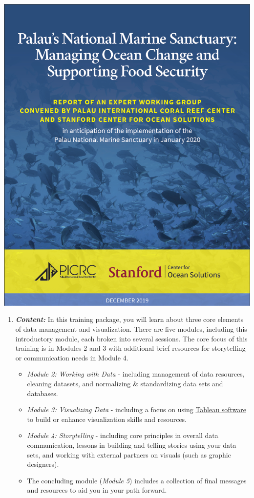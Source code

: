 \documentclass[
]{book}
\providecommand{\tightlist}{%
  \setlength{\itemsep}{0pt}\setlength{\parskip}{0pt}}
\begin{document}
\includegraphics{images/PNMS_Report_Cover.png}

\begin{enumerate}
\def\labelenumi{\arabic{enumi}.}
\setcounter{enumi}{2}
\item
  \textbf{\emph{Content:}} In this training package, you will learn about three core elements of data management and visualization. There are five modules, including this introductory module, each broken into several sessions. The core focus of this training is in Modules 2 and 3 with additional brief resources for storytelling or communication needs in Module 4.

  \begin{itemize}
  \tightlist
  \item
    \emph{Module 2: Working with Data} - including management of data resources, cleaning datasets, and normalizing \& standardizing data sets and databases.
  \item
    \emph{Module 3: Visualizing Data} - including a focus on using \href{https://www.tableau.com/}{Tableau software} to build or enhance visualization skills and resources.
  \item
    \emph{Module 4: Storytelling} - including core principles in overall data communication, lessons in building and telling stories using your data sets, and working with external partners on visuals (such as graphic designers).
  \item
    The concluding module (\emph{Module 5}) includes a collection of final messages and resources to aid you in your path forward.
  \end{itemize}
\end{enumerate}
\end{document}
